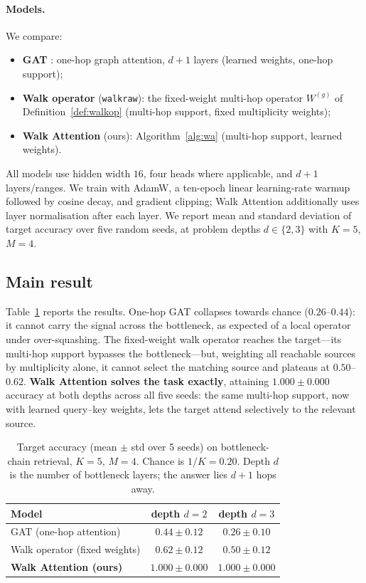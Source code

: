 \paragraph{Models.} We compare:
\begin{itemize}
  \item \textbf{GAT} \cite{velickovic2017graph}: one-hop graph attention, $d{+}1$
  layers (learned weights, one-hop support);
  \item \textbf{Walk operator} (\texttt{walkraw}): the fixed-weight multi-hop
  operator $W^{(g)}$ of Definition~\ref{def:walkop} (multi-hop support, fixed
  multiplicity weights);
  \item \textbf{Walk Attention} (ours): Algorithm~\ref{alg:wa} (multi-hop
  support, learned weights).
\end{itemize}
All models use hidden width $16$, four heads where applicable, and $d{+}1$
layers/ranges. We train with AdamW, a ten-epoch linear learning-rate warmup
followed by cosine decay, and gradient clipping; Walk Attention additionally uses
layer normalisation after each layer. We report mean and standard deviation of
target accuracy over five random seeds, at problem depths $d\in\{2,3\}$ with
$K=5$, $M=4$.

\subsection{Main result}

Table~\ref{tab:main} reports the results. One-hop GAT collapses towards chance
($0.26$--$0.44$): it cannot carry the signal across the bottleneck, as expected
of a local operator under over-squashing. The fixed-weight walk operator reaches
the target---its multi-hop support bypasses the bottleneck---but, weighting all
reachable sources by multiplicity alone, it cannot select the matching source and
plateaus at $0.50$--$0.62$. \textbf{Walk Attention solves the task exactly},
attaining $1.000\pm0.000$ accuracy at both depths across all five seeds: the same
multi-hop support, now with learned query--key weights, lets the target attend
selectively to the relevant source.

\begin{table}[t]
\centering
\caption{Target accuracy (mean $\pm$ std over 5 seeds) on bottleneck-chain
retrieval, $K{=}5$, $M{=}4$. Chance is $1/K=0.20$. Depth $d$ is the number of
bottleneck layers; the answer lies $d{+}1$ hops away.}
\label{tab:main}
\begin{tabular}{lcc}
\toprule
\textbf{Model} & \textbf{depth $d=2$} & \textbf{depth $d=3$} \\
\midrule
GAT (one-hop attention)            & $0.44\pm0.12$ & $0.26\pm0.10$ \\
Walk operator (fixed weights)      & $0.62\pm0.12$ & $0.50\pm0.12$ \\
\textbf{Walk Attention (ours)}     & $\mathbf{1.000\pm0.000}$ & $\mathbf{1.000\pm0.000}$ \\
\bottomrule
\end{tabular}
\end{table}

